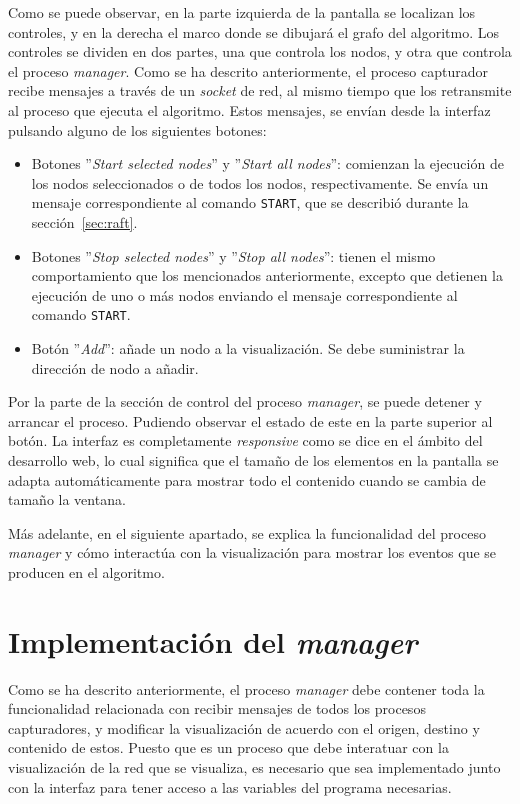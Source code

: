Como se puede observar, en la parte izquierda de la pantalla se localizan los controles, y en la derecha el marco donde se dibujará el grafo del algoritmo. Los controles se dividen en dos partes, una que controla los nodos, y otra que controla el proceso \textit{manager}. Como se ha descrito anteriormente, el proceso capturador recibe mensajes a través de un \textit{socket} de red, al mismo tiempo que los retransmite al proceso que ejecuta el algoritmo. Estos mensajes, se envían desde la interfaz pulsando alguno de los siguientes botones:

\begin{itemize}
\item Botones ''\textit{Start selected nodes}'' y ''\textit{Start all nodes}'': comienzan la ejecución de los nodos seleccionados o de todos los nodos, respectivamente. Se envía un mensaje correspondiente al comando \texttt{START}, que se describió durante la sección~\ref{sec:raft}.

\item Botones ''\textit{Stop selected nodes}'' y ''\textit{Stop all nodes}'': tienen el mismo comportamiento que los mencionados anteriormente, excepto que detienen la ejecución de uno o más nodos enviando el mensaje correspondiente al comando \texttt{START}.

\item Botón ''\textit{Add}'': añade un nodo a la visualización. Se debe suministrar la dirección de nodo a añadir.
\end{itemize}

Por la parte de la sección de control del proceso \textit{manager}, se puede detener y arrancar el proceso. Pudiendo observar el estado de este en la parte superior al botón. La interfaz es completamente \textit{responsive} como se dice en el ámbito del desarrollo web, lo cual significa que el tamaño de los elementos en la pantalla se adapta automáticamente para mostrar todo el contenido cuando se cambia de tamaño la ventana.

Más adelante, en el siguiente apartado, se explica la funcionalidad del proceso \textit{manager} y cómo interactúa con la visualización para mostrar los eventos que se producen en el algoritmo. 

\section{Implementación del \textit{manager}}

Como se ha descrito anteriormente, el proceso \textit{manager} debe contener toda la funcionalidad relacionada con recibir mensajes de todos los procesos capturadores, y modificar la visualización de acuerdo con el origen, destino y contenido de estos. Puesto que es un proceso que debe interatuar con la visualización de la red que se visualiza, es necesario que sea implementado junto con la interfaz para tener acceso a las variables del programa necesarias.

